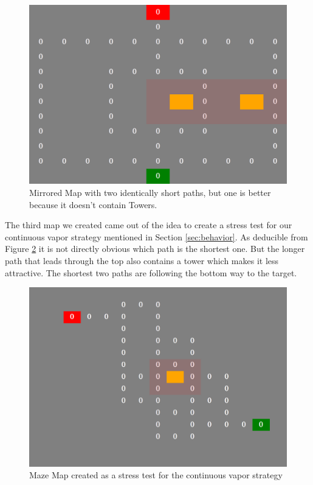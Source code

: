 \begin{figure}[H]
  \centering
  \includegraphics[width=1\linewidth]{images/map_mirror}
  \caption{Mirrored Map with two identically short paths, but one is better because it doesn't contain Towers.}
  \label{fig:mapsmirror}
\end{figure}


The third map we created came out of the idea to create a stress test for our continuous vapor strategy mentioned in Section \ref{sec:behavior}. As deducible from Figure \ref{fig:mapsmaze} it is not directly obvious which path is the shortest one. But the longer path that leads through the top also contains a tower which makes it less attractive. The shortest two paths are following the bottom way to the target.

\begin{figure}[H]
  \centering
  \includegraphics[width=1\linewidth]{images/map_maze}
  \caption{Maze Map created as a stress test for the continuous vapor strategy}
  \label{fig:mapsmaze}
\end{figure}
